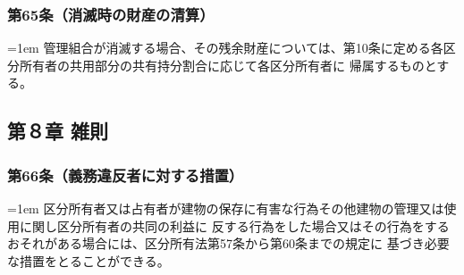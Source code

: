 \documentclass[
  luatex,
  paper=a4paper,
  fontsize=11pt,
  jafontsize=11pt,
  jlreq_notes,
]{jlreq}
\newcommand{\joumain}[1]{%
  \noindent\hangindent=1em\hangafter=1
  \hspace{1em}#1%
}
\begin{document}
  \subsubsection*{第65条（消滅時の財産の清算）}
  \joumain{管理組合が消滅する場合、その残余財産については、第10条に定める各区分所有者の共用部分の共有持分割合に応じて各区分所有者に
  帰属するものとする。}
  
  \begin{center}
  \subsection*{第８章 雑則}
  \end{center}

  \subsubsection*{第66条（義務違反者に対する措置）}
  \joumain{区分所有者又は占有者が建物の保存に有害な行為その他建物の管理又は使用に関し区分所有者の共同の利益に
  反する行為をした場合又はその行為をするおそれがある場合には、区分所有法第57条から第60条までの規定に
  基づき必要な措置をとることができる。}
\end{document}
